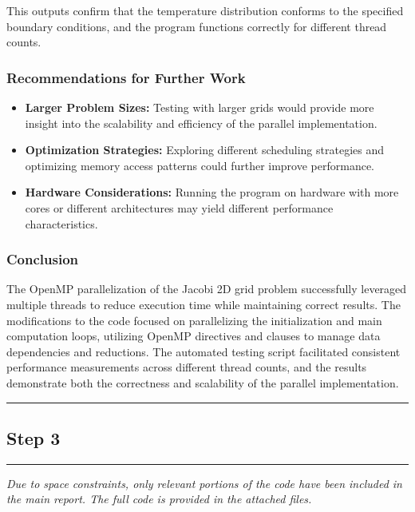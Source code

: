 \documentclass{article}
\begin{document}
This outputs confirm that the temperature distribution conforms to the specified boundary conditions, and the program functions correctly for different thread counts.

\subsubsection{Recommendations for Further Work}

\begin{itemize}
    \item \textbf{Larger Problem Sizes:} Testing with larger grids would provide more insight into the scalability and efficiency of the parallel implementation.
    \item \textbf{Optimization Strategies:} Exploring different scheduling strategies and optimizing memory access patterns could further improve performance.
    \item \textbf{Hardware Considerations:} Running the program on hardware with more cores or different architectures may yield different performance characteristics.
\end{itemize}

\subsubsection{Conclusion}

The OpenMP parallelization of the Jacobi 2D grid problem successfully leveraged multiple threads to reduce execution time while maintaining correct results. The modifications to the code focused on parallelizing the initialization and main computation loops, utilizing OpenMP directives and clauses to manage data dependencies and reductions. The automated testing script facilitated consistent performance measurements across different thread counts, and the results demonstrate both the correctness and scalability of the parallel implementation.

\rule{\linewidth}{0.5pt}

\subsection{Step 3}



\printbibliography

\hrule

\textit{Due to space constraints, only relevant portions of the code have been included in the main report. The full code is provided in the attached files.}
\end{document}
